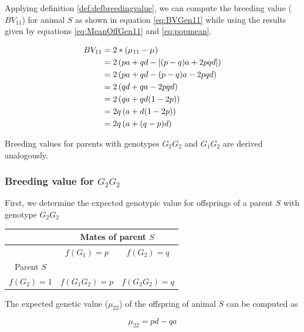 \documentclass[]{book}
\theoremstyle{definition}
\theoremstyle{definition}
\theoremstyle{definition}
\theoremstyle{remark}
\begin{document}
Applying definition \ref{def:defbreedingvalue}, we can compute the breeding value (\(BV_{11}\)) for animal \(S\) as shown in equation \eqref{eq:BVGen11} while using the results given by equations \eqref{eq:MeanOffGen11} and \eqref{eq:popmean}.

\begin{align}
BV_{11} &=  2*(\mu_{11} - \mu)  \notag \\
        &=  2\left(pa + qd - \left[(p - q)a + 2pqd \right] \right) \notag\\
        &=  2\left(pa + qd - (p - q)a - 2pqd \right) \notag\\
        &=  2\left(qd + qa - 2pqd\right) \notag \\
        &=  2\left(qa + qd(1 - 2p)\right) \notag \\
        &=  2q\left(a + d(1 - 2p)\right) \notag \\
        &=  2q\left(a + (q-p)d\right)
\label{eq:BVGen11}
\end{align}

Breeding values for parents with genotypes \(G_2G_2\) and \(G_1G_2\) are derived analogously.

\hypertarget{breeding-value-for-g_2g_2}{%
\subsubsection{\texorpdfstring{Breeding value for \(G_2G_2\)}{Breeding value for G\_2G\_2}}\label{breeding-value-for-g_2g_2}}

First, we determine the expected genotypic value for offsprings of a parent \(S\) with genotype \(G_2G_2\)

\vspace{5ex}

\begin{tabular}{|c|c|c|}
\hline
& \multicolumn{2}{|c|}{Mates of parent $S$} \\
\hline
& $f(G_1) = p$       &  $f(G_2) = q$   \\
\hline
Parent $S$       &                    &                 \\
\hline
$f(G_2) = 1$ &  $f(G_1G_2) = p$   &  $f(G_2G_2) = q$\\
\hline
\end{tabular}

\vspace{5ex}

The expected genetic value (\(\mu_{22}\)) of the offspring of animal \(S\) can be computed as

\begin{equation}
\mu_{22} = pd - qa
\label{eq:MeanOffGen22}
\end{equation}
\end{document}

